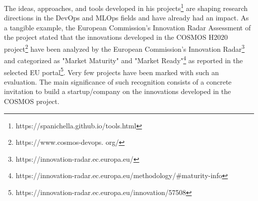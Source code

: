 \documentclass[11pt]{article}
\begin{document}
\vspace{-2.5mm}
The ideas, approaches, and tools developed in his projects\footnote{https://spanichella.github.io/tools.html} are shaping research directions in the DevOps and MLOps fields and have already had an impact. As a tangible example, the European Commission's Innovation Radar Assessment of the project stated that the innovations developed in the COSMOS H2020 project\footnote{https://www.cosmos-devops.
org/} have been analyzed by the European Commission's Innovation Radar\footnote{https://innovation-radar.ec.europa.eu/} and categorized as "Market Maturity" and "Market
Ready"\footnote{https://innovation-radar.ec.europa.eu/methodology/\#maturity-info} as reported in the
selected EU portal\footnote{https://innovation-radar.ec.europa.eu/innovation/57508}. Very few projects
have been marked with such an evaluation. The main significance of such recognition consists of a
concrete invitation to build a startup/company on the innovations developed in the COSMOS project.
\end{document}
